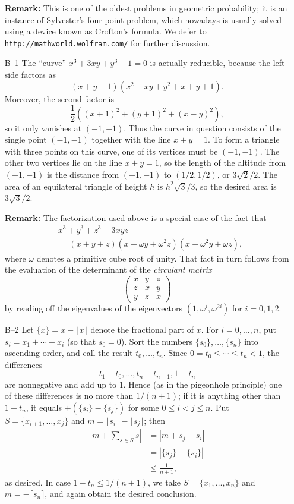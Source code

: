 \documentclass[amssymb,twocolumn,pra,10pt,aps]{revtex4-1}
\begin{document}
\begin{itemize}
\textbf{Remark:}
This is one of the oldest problems in geometric probability; it is an instance
of Sylvester's four-point problem, which nowadays is usually solved using
a device known as Crofton's formula.
We defer to \texttt{http://mathworld.wolfram.com/} for
further discussion.

\item[B--1]
The ``curve'' $x^3 + 3xy + y^3 - 1 = 0$ is actually reducible, because the
left side factors as
\[
(x+y-1)(x^2 -xy + y^2 + x + y + 1).
\]
Moreover, the second factor is
\[
\frac{1}{2} ((x+1)^2 + (y+1)^2 + (x-y)^2),
\]
so it only vanishes at $(-1,-1)$. Thus the curve in question consists of the
single point $(-1,-1)$ together with the line $x+y=1$. To form a triangle
with three points on this curve, one of its vertices must be $(-1,-1)$.
The other two vertices lie on the line $x+y=1$, so the length of the altitude
from $(-1,-1)$ is the distance from $(-1,-1)$ to $(1/2,1/2)$, or
$3 \sqrt{2}/2$. The area of an equilateral triangle of height $h$ is
$h^2 \sqrt{3}/3$, so the desired area is
$3 \sqrt{3}/2$.

\textbf{Remark:} The factorization used above is a special case of the fact
that
\begin{align*}
&x^3 + y^3 + z^3 - 3xyz \\
&= (x+y+z)(x+\omega y + \omega^2 z)(x + \omega^2 y
+ \omega z),
\end{align*}
where $\omega$ denotes a primitive cube root of unity. That fact in turn follows
from the evaluation of the determinant of the \emph{circulant matrix}
\[
\begin{pmatrix} x & y & z \\ z & x & y \\ y & z & x
\end{pmatrix}
\]
by reading off the eigenvalues of the eigenvectors
$(1, \omega^i, \omega^{2i})$ for $i=0,1,2$.

\item[B--2]
Let $\{x\} = x - \lfloor x \rfloor$ denote the fractional part of $x$.
For $i=0,\dots, n$, put $s_i = x_1 + \cdots + x_i$ (so that $s_0 = 0$).
Sort the numbers $\{s_0\}, \dots, \{s_n\}$ into ascending order,
and call the result $t_0, \dots, t_n$. Since $0 = t_0 \leq \cdots \leq
t_n < 1$, the differences
\[
t_1 - t_0, \dots, t_n - t_{n-1}, 1 - t_n
\]
are nonnegative and add up to 1. Hence (as in  the pigeonhole principle) one
of these differences
is no more than $1/(n+1)$; if it is anything other than $1 - t_n$,
it equals $\pm (\{s_i\} - \{s_j\})$ for some
$0 \leq i < j \leq n$. Put $S = \{x_{i+1}, \dots, x_j\}$ and
$m = \lfloor s_i \rfloor - \lfloor s_j \rfloor$; then
\begin{align*}
\left| m + \sum_{s \in S} s \right|
&= |m + s_j - s_i| \\
&= |\{s_j\} - \{s_i\}| \\
&\leq \frac{1}{n+1},
\end{align*}
as desired. In case $1 - t_n \leq 1 / (n+1)$, we take
$S = \{x_1, \dots, x_n\}$ and $m = -\lceil s_n \rceil$, and again obtain
the desired conclusion.


\end{itemize}
\end{document}
